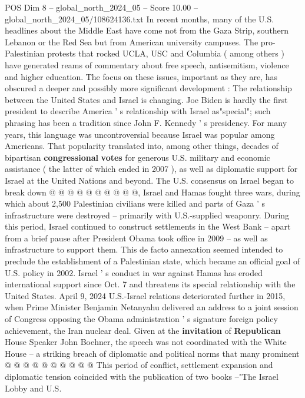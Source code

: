 \begin{textsample}{POS Dim 8 – global\_north\_2024\_05 – Score 10.00 – global\_north\_2024\_05/108624136.txt}  \label{ex:f8_pos_077}
In recent months, many of the U.S. headlines about the Middle East have come not from the Gaza Strip, southern Lebanon or the Red Sea but from American university campuses.
The pro-Palestinian protests that rocked UCLA, USC and Columbia ( among others ) have generated reams of commentary about free speech, antisemitism, violence and higher education.
The focus on these issues, important as they are, has obscured a deeper and possibly more significant development : The relationship between the United States and Israel is changing.
Joe Biden is hardly the first president to describe America ' s relationship with Israel as"special"; such phrasing has been a tradition since John F.
Kennedy ' s presidency.
For many years, this language was uncontroversial because Israel was popular among Americans.
That popularity translated into, among other things, decades of bipartisan \textbf{congressional} \textbf{votes} for generous U.S. military and economic assistance ( the latter of which ended in 2007 ), as well as diplomatic support for Israel at the United Nations and beyond.
The U.S. consensus on Israel began to break down @ @ @ @ @ @ @ @ @ @, Israel and Hamas fought three wars, during which about 2,500 Palestinian civilians were killed and parts of Gaza ' s infrastructure were destroyed -- primarily with U.S.-supplied weaponry.
During this period, Israel continued to construct settlements in the West Bank -- apart from a brief pause after President Obama took office in 2009 -- as well as infrastructure to support them.
This de facto annexation seemed intended to preclude the establishment of a Palestinian state, which became an official goal of U.S. policy in 2002.
Israel ' s conduct in war against Hamas has eroded international support since Oct. 7 and threatens its special relationship with the United States.
April 9, 2024 U.S.-Israel relations deteriorated further in 2015, when Prime Minister Benjamin Netanyahu delivered an address to a joint session of Congress opposing the Obama administration ' s signature foreign policy achievement, the Iran nuclear deal.
Given at the \textbf{invitation} of \textbf{Republican} House Speaker John Boehner, the speech was not coordinated with the White House -- a striking breach of diplomatic and political norms that many prominent @ @ @ @ @ @ @ @ @ @ This period of conflict, settlement expansion and diplomatic tension coincided with the publication of two books --"The Israel Lobby and U.S.

\end{textsample}
